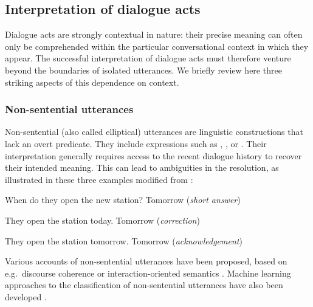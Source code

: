 \subsection{Interpretation of dialogue acts} 

Dialogue acts are strongly contextual in nature: their precise meaning can often only be comprehended within the particular conversational context in which they appear. The successful interpretation  of dialogue acts must therefore venture beyond the boundaries of isolated utterances. We briefly review here three striking aspects of this dependence on context.

\subsubsection*{Non-sentential utterances}
\label{non-sentential utterance}
Non-sentential (also called elliptical) utterances are linguistic constructions that lack an overt predicate.  They include expressions such as  , , or . Their interpretation generally requires access to the recent dialogue history to recover their intended meaning. This can lead to ambiguities in the resolution, as illustrated in these three examples modified from \cite{Fernandez:2007}:

\begin{center}
\begin{dialogue}
 When do they open the new station?
 Tomorrow (\textit{short answer})
\end{dialogue}

\begin{dialogue}
 They open the station today.
 Tomorrow (\textit{correction})
\end{dialogue}

\begin{dialogue}
 They open the station tomorrow.
 Tomorrow (\textit{acknowledgement})
\end{dialogue}
\end{center}

Various accounts of non-sentential utterances have been proposed, based on e.g.\ discourse coherence \citep{Schlangen03theinterpretation} or interaction-oriented semantics \citep{fernandez2006non,Ginzburg2012}. Machine learning approaches to the classification of non-sentential utterances have also been developed \citep{Schlangen:2005,Fernandez:2007}. 


